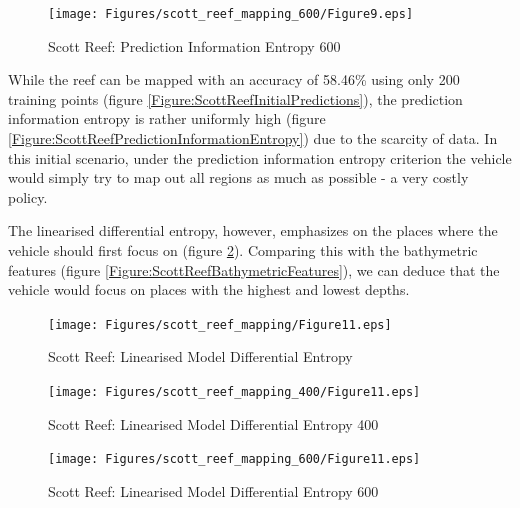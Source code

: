 			\begin{figure}[bp]
			\centering
				\texttt{[image: Figures/scott\_reef\_mapping\_600/Figure9.eps]}
			\caption{Scott Reef: Prediction Information Entropy 600}
			\label{Figure:ScottReefPredictionInformationEntropy600}
			\end{figure}
					
			While the reef can be mapped with an accuracy of 58.46\% using only 200 training points (figure \ref{Figure:ScottReefInitialPredictions}), the prediction information entropy is rather uniformly high (figure \ref{Figure:ScottReefPredictionInformationEntropy}) due to the scarcity of data. In this initial scenario, under the prediction information entropy criterion the vehicle would simply try to map out all regions as much as possible - a very costly policy.

			The linearised differential entropy, however, emphasizes on the places where the vehicle should first focus on (figure \ref{Figure:ScottReefLinearisedDifferentialEntropy}). Comparing this with the bathymetric features (figure \ref{Figure:ScottReefBathymetricFeatures}), we can deduce that the vehicle would focus on places with the highest and lowest depths.
			
			\begin{figure}[!htbp]
			\centering
				\texttt{[image: Figures/scott\_reef\_mapping/Figure11.eps]}
			\caption{Scott Reef: Linearised Model Differential Entropy}
			\label{Figure:ScottReefLinearisedDifferentialEntropy}
			\end{figure}

			\begin{figure}[!htbp]
			\centering
				\texttt{[image: Figures/scott\_reef\_mapping\_400/Figure11.eps]}
			\caption{Scott Reef: Linearised Model Differential Entropy 400}
			\label{Figure:ScottReefLinearisedDifferentialEntropy400}
			\end{figure}
			
			\begin{figure}[!htbp]
			\centering
				\texttt{[image: Figures/scott\_reef\_mapping\_600/Figure11.eps]}
			\caption{Scott Reef: Linearised Model Differential Entropy 600}
			\label{Figure:ScottReefLinearisedDifferentialEntropy600}
			\end{figure}
		
